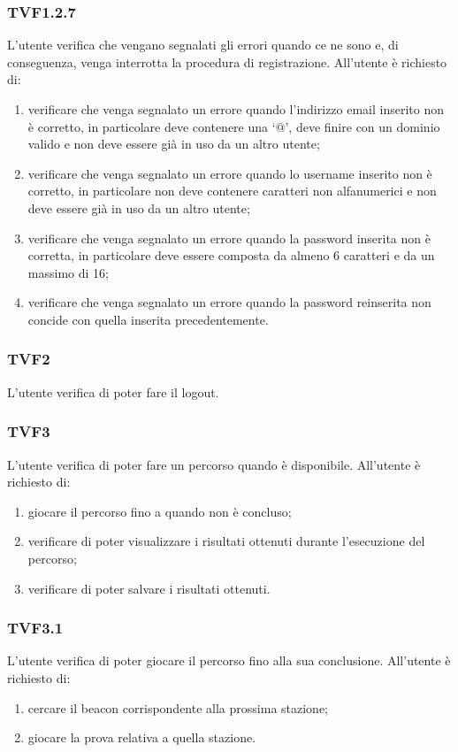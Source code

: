 		\subsubsection{TVF1.2.7}
			L'utente verifica che vengano segnalati gli errori quando ce ne sono e, di conseguenza, venga interrotta la procedura di registrazione.
			All'utente è richiesto di:
			\begin{enumerate}
				\item verificare che venga segnalato un errore quando l'indirizzo email inserito non è corretto, in particolare deve contenere una `@', deve finire con un dominio valido e non deve essere già in uso da un altro utente;
				\item verificare che venga segnalato un errore quando lo username inserito non è corretto, in particolare non deve contenere caratteri non alfanumerici e non deve essere già in uso da un altro utente;
				\item verificare che venga segnalato un errore quando la password inserita non è corretta, in particolare deve essere composta da almeno 6 caratteri e da un massimo di 16;
				\item verificare che venga segnalato un errore quando la password reinserita non concide con quella inserita precedentemente.
			\end{enumerate}
		\subsubsection{TVF2}
			L'utente verifica di poter fare il logout.
		\subsubsection{TVF3}
			L'utente verifica di poter fare un percorso quando è disponibile.
			All'utente è richiesto di:
			\begin{enumerate}
				\item giocare il percorso fino a quando non è concluso;
				\item verificare di poter visualizzare i risultati ottenuti durante l'esecuzione del percorso;
				\item verificare di poter salvare i risultati ottenuti.
			\end{enumerate}
		\subsubsection{TVF3.1}
			L'utente verifica di poter giocare il percorso fino alla sua conclusione.
			All'utente è richiesto di:
			\begin{enumerate}
				\item cercare il beacon corrispondente alla prossima stazione;
				\item giocare la prova relativa a quella stazione.
			\end{enumerate}
